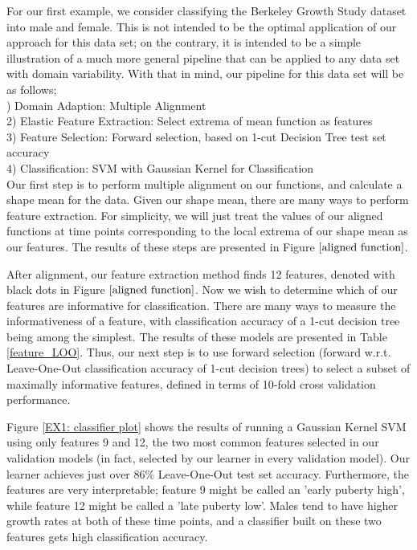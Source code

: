 \documentclass[]{article}
\begin{document}
For our first example, we consider classifying the Berkeley Growth Study dataset into male and female. This is not intended to be the optimal application of our approach for this data set; on the contrary, it is intended to be a simple illustration of a much more general pipeline that can be applied to any data set with domain variability. With that in mind, our pipeline for this data set will be as follows;\\

) Domain Adaption: Multiple Alignment\\
2) Elastic Feature Extraction: Select extrema of mean function as features\\
3) Feature Selection: Forward selection, based on 1-cut Decision Tree test set accuracy\\
4) Classification: SVM with Gaussian Kernel for Classification\\

Our first step is to perform multiple alignment on our functions, and calculate a shape mean for the data. Given our shape mean, there are many ways to perform feature extraction. For simplicity, we will just treat the values of our aligned functions at time points corresponding to the local extrema of our shape mean as our features. The results of these steps are presented in Figure $\ref{aligned function}$. 

After alignment, our feature extraction method finds 12 features, denoted with black dots in Figure $\ref{aligned function}$. Now we wish to determine which of our features are informative for classification. There are many ways to measure the informativeness of a feature, with classification accuracy of a 1-cut decision tree being among the simplest. The results of these models are presented in Table \ref{feature_LOO}. Thus, our next step is to use forward selection (forward w.r.t. Leave-One-Out classification accuracy of 1-cut decision trees) to select a subset of maximally informative features, defined in terms of 10-fold cross validation performance.

Figure \ref{EX1: classifier plot} shows the results of running a Gaussian Kernel SVM using only features 9 and 12, the two most common features selected in our validation models (in fact, selected by our learner in every validation model). Our learner achieves just over 86\% Leave-One-Out test set accuracy. Furthermore, the features are very interpretable; feature 9 might be called an 'early puberty high', while feature 12 might be called a 'late puberty low'. Males tend to have higher growth rates at both of these time points, and a classifier built on these two features gets high classification accuracy.
\end{document}
